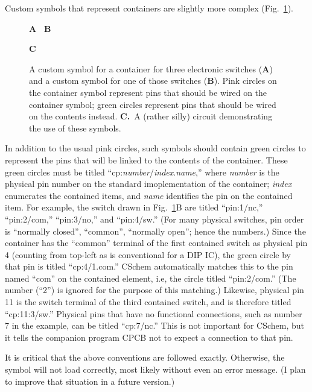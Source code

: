 \documentclass[11pt]{report}
\def\subfig#1#2{{\sf\small\bfseries#1}\raisebox{-.2in}{\raisebox{-.5\height}{\texttt{[image: \#2]}}}}
\begin{document}
Custom symbols that represent containers are slightly more complex
(Fig.~\ref{fig.cont}).
%
\begin{figure}[h]
  \mbox{}\hfill
  \subfig{A~}{ug-switchcont}
  \hfill
     \subfig{B~}{ug-switch}
     \hfill\mbox{}

   \mbox{}\hfill
   \subfig{C~~}{ug-sillyswitch}
        \hfill\mbox{}

  \caption{A custom symbol for a container for three electronic
    switches ({\bf A}) and a custom symbol for one of those switches
    ({\bf B}). Pink circles on the container symbol represent pins
    that should be wired on the container symbol; green circles
    represent pins that should be wired on the contents instead. {\bf
      C.}~A (rather silly) circuit demonstrating the use of these
    symbols.}\label{fig.cont}
\end{figure}
%
In addition to the usual pink circles, such symbols should contain
green circles to represent the pins that will be linked to the
contents of the container. These green circles must be titled
``cp:\emph{number}/\emph{index}.\emph{name},'' where \emph{number} is
the physical pin number on the standard imoplementation of the
container; \emph{index} enumerates the contained items, and
\emph{name} identifies the pin on the contained item. For example, the
switch drawn in Fig.~\ref{fig.cont}B are titled ``pin:1/nc,''
``pin:2/com,'' ``pin:3/no,'' and ``pin:4/sw.'' (For many physical
switches, pin order is ``normally closed'', ``common'', ``normally
open''; hence the numbers.) Since the container has the ``common''
terminal of the first contained switch as physical pin 4 (counting
from top-left as is conventional for a DIP IC), the green circle by
that pin is titled ``cp:4/1.com.''  CSchem automatically matches this
to the pin named ``com'' on the contained element, i.e, the circle
titled ``pin:2/com.'' (The number (``2'') is ignored for the purpose
of this matching.)  Likewise, physical pin 11 is the switch terminal
of the third contained switch, and is therefore titled ``cp:11:3/sw.''
Physical pins that have no functional connections, such as number 7 in
the example, can be titled ``cp:7/nc.'' This is not important for
CSchem, but it tells the companion program CPCB not to expect a
connection to that pin.

It is critical that the above conventions are followed
exactly. Otherwise, the symbol will not load correctly, most likely
without even an error message. (I plan to improve that situation in a
future version.)  
\end{document}

